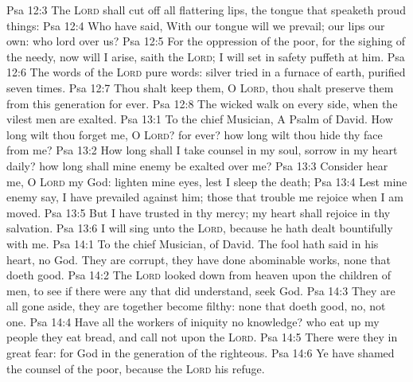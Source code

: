 \vs Psa 12:3 The \textsc{Lord} shall cut off all flattering lips,  the tongue that speaketh proud things:
\vs Psa 12:4 Who have said, With our tongue will we prevail; our lips  our own: who  lord over us?
\vs Psa 12:5 For the oppression of the poor, for the sighing of the needy, now will I arise, saith the \textsc{Lord}; I will set  in safety  puffeth at him.
\vs Psa 12:6 The words of the \textsc{Lord}  pure words:  silver tried in a furnace of earth, purified seven times.
\vs Psa 12:7 Thou shalt keep them, O \textsc{Lord}, thou shalt preserve them from this generation for ever.
\vs Psa 12:8 The wicked walk on every side, when the vilest men are exalted.
\vs Psa 13:1 To the chief Musician, A Psalm of David. How long wilt thou forget me, O \textsc{Lord}? for ever? how long wilt thou hide thy face from me?
\vs Psa 13:2 How long shall I take counsel in my soul,  sorrow in my heart daily? how long shall mine enemy be exalted over me?
\vs Psa 13:3 Consider  hear me, O \textsc{Lord} my God: lighten mine eyes, lest I sleep the  death;
\vs Psa 13:4 Lest mine enemy say, I have prevailed against him;  those that trouble me rejoice when I am moved.
\vs Psa 13:5 But I have trusted in thy mercy; my heart shall rejoice in thy salvation.
\vs Psa 13:6 I will sing unto the \textsc{Lord}, because he hath dealt bountifully with me.
\vs Psa 14:1 To the chief Musician,  of David. The fool hath said in his heart,  no God. They are corrupt, they have done abominable works,  none that doeth good.
\vs Psa 14:2 The \textsc{Lord} looked down from heaven upon the children of men, to see if there were any that did understand,  seek God.
\vs Psa 14:3 They are all gone aside, they are  together become filthy:  none that doeth good, no, not one.
\vs Psa 14:4 Have all the workers of iniquity no knowledge? who eat up my people  they eat bread, and call not upon the \textsc{Lord}.
\vs Psa 14:5 There were they in great fear: for God  in the generation of the righteous.
\vs Psa 14:6 Ye have shamed the counsel of the poor, because the \textsc{Lord}  his refuge.
